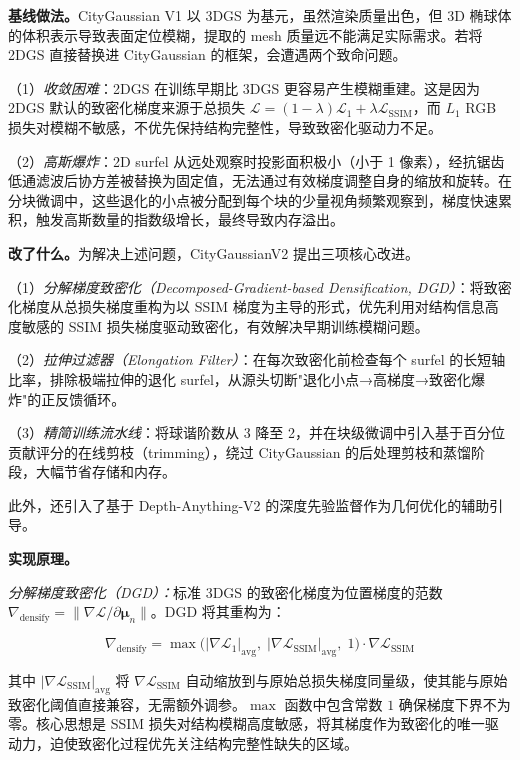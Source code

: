 \textbf{基线做法。}CityGaussian V1 以 3DGS 为基元，虽然渲染质量出色，但 3D 椭球体的体积表示导致表面定位模糊，提取的 mesh 质量远不能满足实际需求。若将 2DGS 直接替换进 CityGaussian 的框架，会遭遇两个致命问题。

（1）\emph{收敛困难}：2DGS 在训练早期比 3DGS 更容易产生模糊重建。这是因为 2DGS 默认的致密化梯度来源于总损失 $\mathcal{L} = (1-\lambda)\mathcal{L}_1 + \lambda \mathcal{L}_{\text{SSIM}}$，而 $L_1$ RGB 损失对模糊不敏感，不优先保持结构完整性，导致致密化驱动力不足。

（2）\emph{高斯爆炸}：2D surfel 从远处观察时投影面积极小（小于 1 像素），经抗锯齿低通滤波后协方差被替换为固定值，无法通过有效梯度调整自身的缩放和旋转。在分块微调中，这些退化的小点被分配到每个块的少量视角频繁观察到，梯度快速累积，触发高斯数量的指数级增长，最终导致内存溢出。

\textbf{改了什么。}为解决上述问题，CityGaussianV2 提出三项核心改进。

（1）\emph{分解梯度致密化（Decomposed-Gradient-based Densification, DGD）}：将致密化梯度从总损失梯度重构为以 SSIM 梯度为主导的形式，优先利用对结构信息高度敏感的 SSIM 损失梯度驱动致密化，有效解决早期训练模糊问题。

（2）\emph{拉伸过滤器（Elongation Filter）}：在每次致密化前检查每个 surfel 的长短轴比率，排除极端拉伸的退化 surfel，从源头切断"退化小点→高梯度→致密化爆炸"的正反馈循环。

（3）\emph{精简训练流水线}：将球谐阶数从 3 降至 2，并在块级微调中引入基于百分位贡献评分的在线剪枝（trimming），绕过 CityGaussian 的后处理剪枝和蒸馏阶段，大幅节省存储和内存。

此外，还引入了基于 Depth-Anything-V2 的深度先验监督作为几何优化的辅助引导。

\textbf{实现原理。}

\emph{分解梯度致密化（DGD）：}标准 3DGS 的致密化梯度为位置梯度的范数 $\nabla_{\text{densify}} = \|\nabla \mathcal{L} / \partial \boldsymbol{\mu}_n\|$。DGD 将其重构为：

\begin{equation}
\nabla_{\text{densify}} = \max\!\bigl(|\nabla \mathcal{L}_1|_{\text{avg}},\; |\nabla \mathcal{L}_{\text{SSIM}}|_{\text{avg}},\; 1\bigr) \cdot \nabla \mathcal{L}_{\text{SSIM}}
\end{equation}

其中 $|\nabla \mathcal{L}_{\text{SSIM}}|_{\text{avg}}$ 将 $\nabla \mathcal{L}_{\text{SSIM}}$ 自动缩放到与原始总损失梯度同量级，使其能与原始致密化阈值直接兼容，无需额外调参。$\max$ 函数中包含常数 $1$ 确保梯度下界不为零。核心思想是 SSIM 损失对结构模糊高度敏感，将其梯度作为致密化的唯一驱动力，迫使致密化过程优先关注结构完整性缺失的区域。

